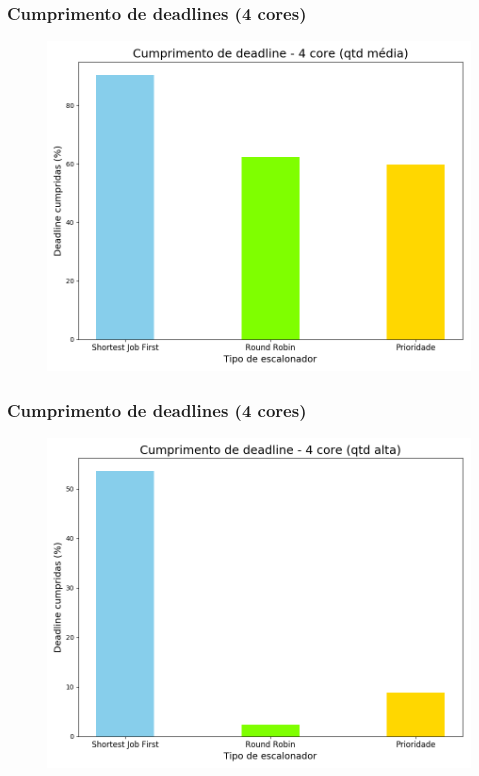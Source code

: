 \documentclass{beamer}
\begin{document}
\begin{frame}
\frametitle{Cumprimento de deadlines (4 cores)}
\begin{figure}
\includegraphics[scale=0.4]{deadline_med_4.png}
\end{figure}
\end{frame}

\begin{frame}
\frametitle{Cumprimento de deadlines (4 cores)}
\begin{figure}
\includegraphics[scale=0.4]{deadline_long_4.png}
\end{figure}
\end{frame}
\end{document}
